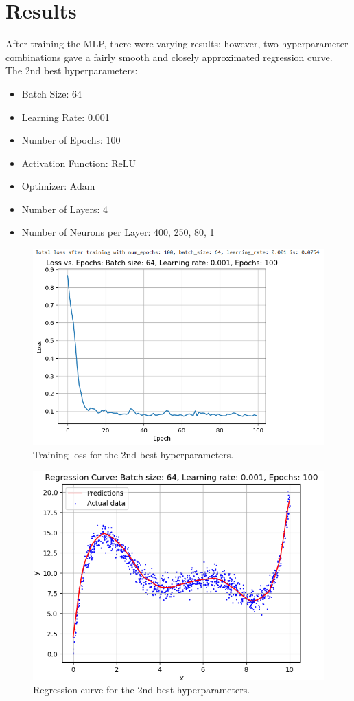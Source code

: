 \documentclass[12pt]{article}
\begin{document}
\section{Results}
After training the MLP, there were varying results; however, two hyperparameter combinations gave a fairly smooth and closely approximated regression curve. \\

\noindent The 2nd best hyperparameters:
\begin{itemize}
    \item Batch Size: 64
    \item Learning Rate: 0.001
    \item Number of Epochs: 100
    \item Activation Function: ReLU
    \item Optimizer: Adam
    \item Number of Layers: 4
    \item Number of Neurons per Layer: 400, 250, 80, 1
\end{itemize}

\begin{figure}[ht]
    \centering
    \includegraphics[width=0.9\linewidth]{Loss2ndBest.PNG}
    \caption{Training loss for the 2nd best hyperparameters.}
\end{figure}

\newpage

\begin{figure}[ht]
    \centering
    \includegraphics[width=0.9\linewidth]{RegressionCurve2ndBest.PNG}
    \caption{Regression curve for the 2nd best hyperparameters.}
\end{figure}
\end{document}
